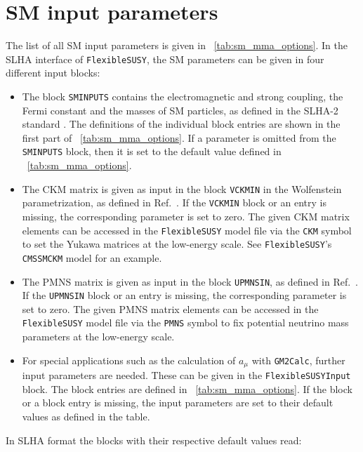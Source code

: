 \documentclass[final,3p,11pt,pdflatex]{elsarticle}
\makeatletter
\newcommand{\modelname}[1]{\texttt{#1}\@\xspace}
\newcommand{\fs}{\texttt{FlexibleSUSY}\@\xspace}
\newcommand{\GMTCalc}{\texttt{GM2Calc}\@\xspace}
\newcommand{\amu}{\ensuremath{a_\mu}\xspace}
\newcommand{\tabref}[1]{\tablename~\ref{#1}}
\makeatother
\begin{document}
\appendix
\renewcommand*{\thesection}{\Alph{section}}

\section{SM input parameters}
\label{app:sm_input_parameters}
%
The list of all SM input parameters is given
in \tabref{tab:sm_mma_options}.  In the SLHA interface of \fs, the
SM parameters can be given in four different input blocks:
%
\begin{itemize}
\item The block \texttt{SMINPUTS} contains the electromagnetic and
  strong coupling, the Fermi constant and the masses of SM
  particles, as defined in the SLHA-2 standard \cite{Allanach:2008qq}.
  The definitions of the individual block entries are shown in the
  first part of \tabref{tab:sm_mma_options}.  If a parameter is
  omitted from the \texttt{SMINPUTS} block, then it is set to the
  default value defined in \tabref{tab:sm_mma_options}.
\item The CKM matrix is given as input in the block \texttt{VCKMIN} in
  the Wolfenstein parametrization, as defined in
  Ref.~\cite{Allanach:2008qq}.  If the \texttt{VCKMIN} block or an entry is
  missing, the corresponding parameter is set to zero.
  The given CKM matrix elements can be accessed in the \fs model file
  via the \texttt{CKM} symbol to set the Yukawa matrices at the
  low-energy scale.  See \fs's \modelname{CMSSMCKM} model for an example.
\item The PMNS matrix is given as input in the block
  \texttt{UPMNSIN}, as defined in Ref.~\cite{Allanach:2008qq}.  If the
  \texttt{UPMNSIN} block or an entry is missing, the corresponding
  parameter is set to zero.
  The given PMNS matrix elements can be accessed in the \fs model file
  via the \texttt{PMNS} symbol to fix potential neutrino mass
  parameters at the low-energy scale.
\item For special applications such as the calculation of
  $\amu$ with \GMTCalc, further input parameters are
  needed.  These can be given in the \texttt{FlexibleSUSYInput} block.
  The block entries are defined in \tabref{tab:sm_mma_options}.  If
  the block or a block entry is missing, the input parameters are set
  to their default values as defined in the table.
\end{itemize}
%
In SLHA format the blocks with their respective default values read:
%
\end{document}
